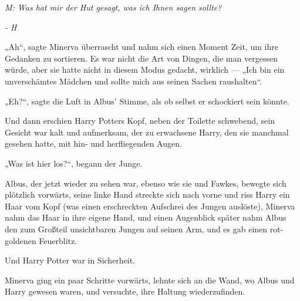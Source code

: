 \emph{M: Was hat mir der Hut gesagt, was ich Ihnen sagen sollte?}

\emph{- H}

„Ah“, sagte Minerva überrascht und nahm sich einen Moment Zeit, um ihre Gedanken zu sortieren. Es war nicht die Art von Dingen, die man vergessen würde, aber sie hatte nicht in diesem Modus gedacht, wirklich —
„Ich bin ein unverschämtes Mädchen und sollte mich aus seinen Sachen raushalten“.

„Eh?“, sagte die Luft in Albus’ Stimme, als ob selbst er schockiert sein könnte.

Und dann erschien Harry Potters Kopf, neben der Toilette schwebend, sein Gesicht war kalt und aufmerksam, der zu erwachsene Harry, den sie manchmal gesehen hatte, mit hin- und herfliegenden Augen.

„Was ist hier los?“, begann der Junge.

Albus, der jetzt wieder zu sehen war, ebenso wie sie und Fawkes, bewegte sich plötzlich vorwärts, seine linke Hand streckte sich nach vorne und riss Harry ein Haar vom Kopf (was einen erschreckten Aufschrei des Jungen auslöste), Minerva nahm das Haar in ihre eigene Hand, und einen Augenblick später nahm Albus den zum Großteil unsichtbaren Jungen auf seinen Arm, und es gab einen rot-goldenen Feuerblitz.

Und Harry Potter war in Sicherheit.

Minerva ging ein paar Schritte vorwärts, lehnte sich an die Wand, wo Albus und Harry gewesen waren, und versuchte, ihre Haltung wiederzufinden.

